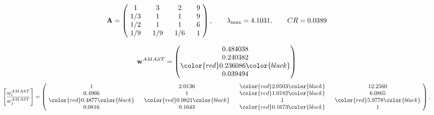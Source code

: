 \begin{example}
\begin{equation*}
\mathbf{A} =
\begin{pmatrix}
$\,\,$ 1 $\,\,$ & $\,\,$3$\,\,$ & $\,\,$2$\,\,$ & $\,\,$9 $\,\,$ \\
$\,\,$ 1/3$\,\,$ & $\,\,$ 1 $\,\,$ & $\,\,$1$\,\,$ & $\,\,$9 $\,\,$ \\
$\,\,$ 1/2$\,\,$ & $\,\,$ 1 $\,\,$ & $\,\,$ 1 $\,\,$ & $\,\,$6 $\,\,$ \\
$\,\,$ 1/9$\,\,$ & $\,\,$ 1/9$\,\,$ & $\,\,$ 1/6$\,\,$ & $\,\,$ 1  $\,\,$ \\
\end{pmatrix},
\qquad
\lambda_{\max} =
4.1031,
\qquad
CR = 0.0389
\end{equation*}

\begin{equation*}
\mathbf{w}^{AMAST} =
\begin{pmatrix}
0.484038\\
0.240382\\
\color{red} 0.236086\color{black} \\
0.039494
\end{pmatrix}\end{equation*}
\begin{equation*}
\left[ \frac{{w}^{AMAST}_i}{{w}^{AMAST}_j} \right] =
\begin{pmatrix}
$\,\,$ 1 $\,\,$ & $\,\,$2.0136$\,\,$ & $\,\,$\color{red} 2.0503\color{black} $\,\,$ & $\,\,$12.2560$\,\,$ \\
$\,\,$0.4966$\,\,$ & $\,\,$ 1 $\,\,$ & $\,\,$\color{red} 1.0182\color{black} $\,\,$ & $\,\,$6.0865  $\,\,$ \\
$\,\,$\color{red} 0.4877\color{black} $\,\,$ & $\,\,$\color{red} 0.9821\color{black} $\,\,$ & $\,\,$ 1 $\,\,$ & $\,\,$\color{red} 5.9778\color{black}  $\,\,$ \\
$\,\,$0.0816$\,\,$ & $\,\,$0.1643$\,\,$ & $\,\,$\color{red} 0.1673\color{black} $\,\,$ & $\,\,$ 1  $\,\,$ \\
\end{pmatrix},
\end{equation*}


\end{example}
